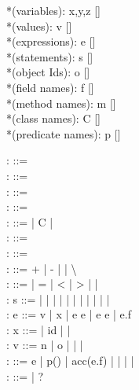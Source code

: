\documentclass {llncs}
\begin{document}
\begin{plstx}
*(variables): x,y,z [\in]  \\
*(values): v [\in]  \\
*(expressions): e [\in]  \\
*(statements): s [\in]  \\
*(object Ids): o [\in]  \\
*(field names): f [\in]  \\
*(method names): m [\in]  \\
*(class names): C [\in]  \\
*(predicate names): p [\in]  \\
\end{plstx}

\begin{plstx}
:  ::=  \\
:  ::=  \\
:  ::=  \\
:  ::=  \\
:  ::= \Tint | C | \top \\
:  ::=  \\
:  ::= \contract{\gphi}{\gphi} \\
: \oplus ::= + | - | \ast | \backslash \\
: \odot ::= \neq | = | < | > | \leq | \geq \\
: s ::= \sSkip |  |  |  |  |  |  |  |  | \sAssert{\phi} |  |  \\
: e ::= v | x | e \oplus e | e \odot e | e.f \\
: x ::= \eresult | id |  | \ethis \\
: v ::= n | o | \enull | \phiTrue | \phiFalse \\
: \phi ::= e | p() | acc(e.f) | \phi \wedge \phi | \phi \ast \phi |  | \\
: \gphi ::= \phi | ? \ast \phi \\
\end{plstx}
\end{document}
